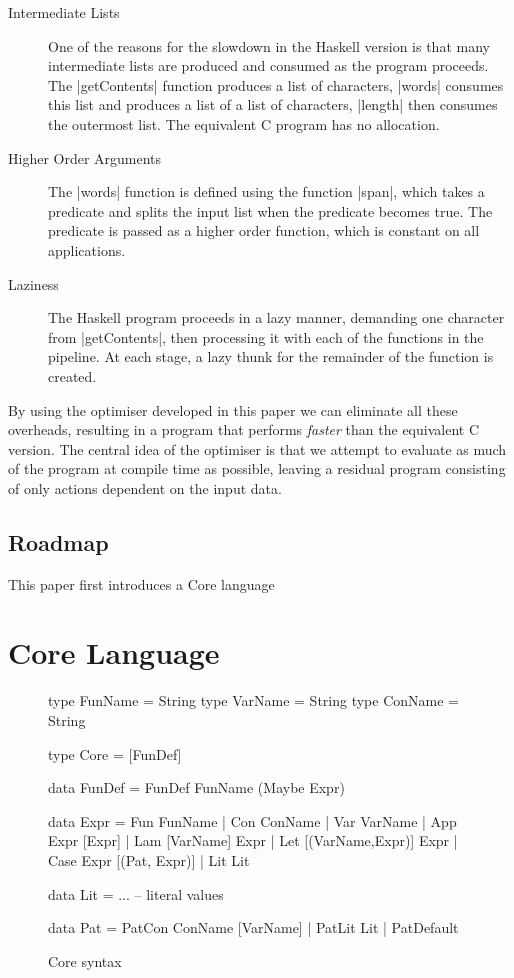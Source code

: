 \documentclass{llncs}
\begin{document}
\begin{description}
\item[Intermediate Lists] One of the reasons for the slowdown in the Haskell version is that many intermediate lists are produced and consumed as the program proceeds. The |getContents| function produces a list of characters, |words| consumes this list and produces a list of a list of characters, |length| then consumes the outermost list. The equivalent C program has no allocation.
\item[Higher Order Arguments] The |words| function is defined using the function |span|, which takes a predicate and splits the input list when the predicate becomes true. The predicate is passed as a higher order function, which is constant on all applications.
\item[Laziness] The Haskell program proceeds in a lazy manner, demanding one character from |getContents|, then processing it with each of the functions in the pipeline. At each stage, a lazy thunk for the remainder of the function is created.
\end{description}

By using the optimiser developed in this paper we can eliminate all these overheads, resulting in a program that performs \textit{faster} than the equivalent C version. The central idea of the optimiser is that we attempt to evaluate as much of the program at compile time as possible, leaving a residual program consisting of only actions dependent on the input data.

\subsection{Roadmap}

This paper first introduces a Core language 

\section{Core Language}

\begin{figure}
\begin{code}
type FunName  = String
type VarName  = String
type ConName  = String

type Core = [FunDef]

data FunDef  =  FunDef FunName (Maybe Expr)

data Expr  =  Fun   FunName
           |  Con   ConName
           |  Var   VarName
           |  App   Expr [Expr]
           |  Lam   [VarName] Expr
           |  Let   [(VarName,Expr)] Expr
           |  Case  Expr [(Pat, Expr)]
           |  Lit   Lit

data Lit = ... -- literal values

data Pat = PatCon  ConName [VarName]
         | PatLit  Lit
         | PatDefault
\end{code}
\caption{Core syntax}
\label{fig:core}
\end{figure}
\end{document}

